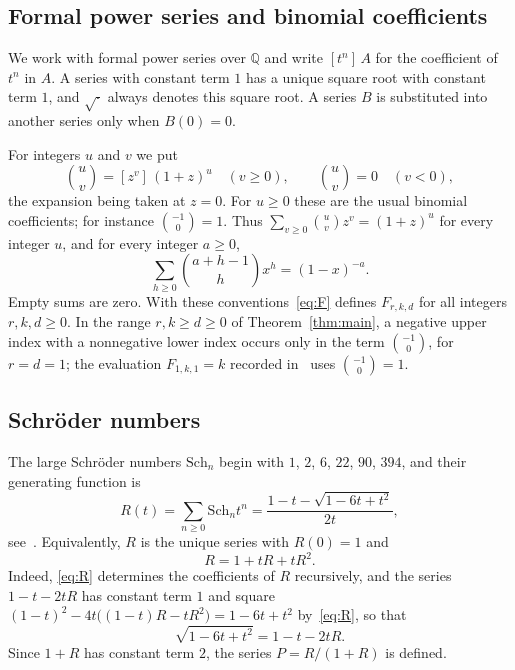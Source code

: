 \documentclass{amsart}
\theoremstyle{definition}
\theoremstyle{remark}
\numberwithin{equation}{section}
\newcommand{\Q}{\mathbb{Q}}
\newcommand{\Sch}{\mathrm{Sch}}
\newcommand{\coef}[1]{[#1]\,}
\begin{document}
\subsection{Formal power series and binomial coefficients}\label{sec:series}

We work with formal power series over $\Q$ and write $\coef{t^n}A$ for the coefficient of $t^n$ in $A$. A series with constant term $1$ has a unique square root with constant term $1$, and $\sqrt{\cdot}$ always denotes this square root. A series $B$ is substituted into another series only when $B(0)=0$.

For integers $u$ and $v$ we put
\[
\binom{u}{v}=\coef{z^v}(1+z)^u\quad(v\ge0),\qquad\binom{u}{v}=0\quad(v<0),
\]
the expansion being taken at $z=0$. For $u\ge0$ these are the usual binomial coefficients; for instance $\binom{-1}{0}=1$. Thus $\sum_{v\ge0}\binom{u}{v}z^v=(1+z)^u$ for every integer $u$, and for every integer $a\ge0$,
\begin{equation}\label{eq:negbin}
\sum_{h\ge0}\binom{a+h-1}{h}x^h=(1-x)^{-a}.
\end{equation}
Empty sums are zero. With these conventions~\eqref{eq:F} defines $F_{r,k,d}$ for all integers $r,k,d\ge0$. In the range $r,k\ge d\ge0$ of Theorem~\ref{thm:main}, a negative upper index with a nonnegative lower index occurs only in the term $\binom{-1}{0}$, for $r=d=1$; the evaluation $F_{1,k,1}=k$ recorded in~\cite[p.~9]{HKL} uses $\binom{-1}{0}=1$.

\subsection{Schr\"oder numbers}

The large Schr\"oder numbers $\Sch_n$ begin with $1$, $2$, $6$, $22$, $90$, $394$, and their generating function is
\[
R(t)=\sum_{n\ge0}\Sch_n t^n=\frac{1-t-\sqrt{1-6t+t^2}}{2t},
\]
see~\cite[Section~3]{HKL}. Equivalently, $R$ is the unique series with $R(0)=1$ and
\begin{equation}\label{eq:R}
R=1+tR+tR^2.
\end{equation}
Indeed, \eqref{eq:R} determines the coefficients of $R$ recursively, and the series $1-t-2tR$ has constant term $1$ and square $(1-t)^2-4t\bigl((1-t)R-tR^2\bigr)=1-6t+t^2$ by~\eqref{eq:R}, so that
\begin{equation}\label{eq:sqrt}
\sqrt{1-6t+t^2}=1-t-2tR.
\end{equation}
Since $1+R$ has constant term $2$, the series $P=R/(1+R)$ is defined.
\end{document}
